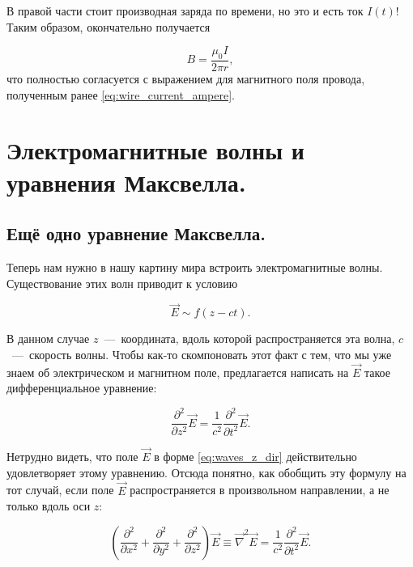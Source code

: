 \documentclass[a4paper,12pt]{article}
\numberwithin{equation}{section}
\newcommand{\pt}{\partial}
\newcommand{\vn}{\vec{\nabla}}
\begin{document}
В правой части стоит производная заряда по времени, но это и есть ток
$I(t)$! Таким образом, окончательно получается

\begin{equation}
  \label{eq:displacement_cur_4}
  B = \frac{\mu_0 I }{2\pi r},
\end{equation}
что полностью согласуется с выражением для магнитного поля провода,
полученным ранее \eqref{eq:wire_current_ampere}.

\section{Электромагнитные волны  и уравнения Максвелла. }
\label{sec:em_waves}

\subsection{Ещё одно уравнение Максвелла.}
\label{sec:maxwell_eq_4}

Теперь нам нужно в нашу картину мира встроить электромагнитные
волны. Существование этих волн приводит к условию

\begin{equation}
  \label{eq:waves_z_dir}
  \vec{E} \sim f (z-ct).
\end{equation}

В данном случае $z$~---~координата, вдоль которой распространяется эта
волна, $c$~---~скорость волны. Чтобы как-то скомпоновать этот факт с
тем, что мы уже знаем об электрическом и магнитном поле, предлагается
написать на $\vec{E}$ такое дифференциальное уравнение: 

\begin{equation}
  \label{eq:waves_diff_eq}
  \frac{\pt^2}{\pt z^2} \vec{E} = \frac{1}{c^2} \frac{\pt^2}{\pt t^2} \vec{E}.
\end{equation}

Нетрудно видеть, что поле $\vec{E}$ в форме \eqref{eq:waves_z_dir}
действительно удовлетворяет этому уравнению. Отсюда понятно, как
обобщить эту формулу на тот случай, если поле $\vec{E}$
распространяется в произвольном направлении, а не только вдоль оси
$z$: 

\begin{equation}
  \label{eq:waves_arb_dir}
   \left( \frac{\pt^2}{\pt x^2} + \frac{\pt^2}{\pt y^2} + \frac{\pt^2}{\pt
     z^2} \right) \vec{E} \equiv \vn^2 \vec{E} = \frac{1}{c^2} \frac{\pt^2}{\pt t^2} \vec{E}.
\end{equation}
\end{document}

